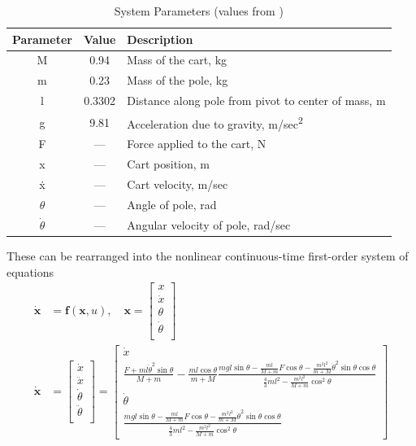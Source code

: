 \documentclass{article}
\newcommand{\matr}[1]{\bm{#1}}     %
\begin{document}
\begin{table}[h!]
 \centering
  \renewcommand{\arraystretch}{1.5}
 \begin{tabular}{ |c |c  |l |}
 \hline
 	 \textbf{Parameter} & \textbf{Value} & \textbf{Description}  \\ \hline
 	 M & 0.94 & Mass of the cart, kg \\ \hline
 	 m & 0.23 & Mass of the pole, kg \\ \hline
 	 l & 0.3302 & Distance along pole from pivot to center of mass, m \\ \hline
 	 g & 9.81 & Acceleration due to gravity, m/{sec\textsuperscript{2}} \\ \hline
 	 F & --- & Force applied to the cart, N \\ \hline
 	 x & --- & Cart position, m \\ \hline
 	 \.x & --- & Cart velocity, m/sec \\ \hline
 	 $\theta$ & --- & Angle of pole, rad \\ \hline
 	 $\dot\theta$ & --- & Angular velocity of pole, rad/sec \\ \hline
 \end{tabular}
 \caption{System Parameters (values from \cite{lab6})}
 \label{table:paramvalues}
 \end{table}
 \FloatBarrier
These can be rearranged into the nonlinear continuous-time first-order system of equations
\begin{equation}
\begin{aligned}
\matr{\dot{x}} &= \matr{f}(\matr{x},u),\quad  \matr{x} = \begin{bmatrix}
	x \\
	\dot{x} \\
	\theta \\
	\dot{\theta} \\
\end{bmatrix} \\
\matr{\dot{x}} &= \begin{bmatrix}
	\dot{x} \\
	\ddot{x} \\
	\dot{\theta} \\
	\ddot{\theta} \\
\end{bmatrix} = \begin{bmatrix}
\dot{x} \\
\frac{F+ml\dot{\theta}^2\sin\theta}{M+m} -\frac{ml\cos\theta}{m+M}\frac{mgl\sin\theta- \frac{ml}{M+m} F\cos\theta -\frac{m^2l^2}{m+M}\dot{\theta}^2\sin\theta\cos\theta}{\frac{4}{3}ml^2-\frac{m^2l^2}{M+m}\cos^2 \theta} \\[6pt]
\dot{\theta} \\
\frac{mgl\sin\theta - \frac{ml}{M+m} F\cos\theta -\frac{m^2l^2}{m+M}\dot{\theta}^2\sin\theta\cos\theta}{\frac{4}{3}ml^2-\frac{m^2l^2}{M+m}\cos^2 \theta }
\end{bmatrix}
\end{aligned}
\label{eq:nonlinear_ss_continuous}
\end{equation}
\end{document}
